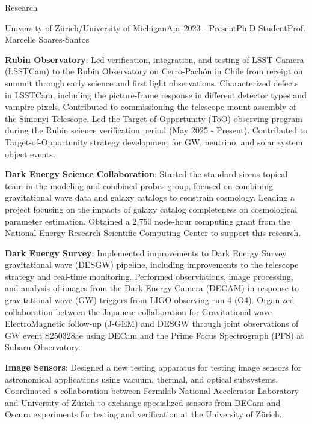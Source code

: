 \documentclass{resume} %
\begin{document}
\begin{rSection}{Research}

\begin{rSubsection}{University of Zürich/University of Michigan}{Apr 2023 - Present}{Ph.D Student}{Prof. Marcelle Soares-Santos}

    \item \textbf{Rubin Observatory}: Led verification, integration, and testing of LSST Camera (LSSTCam) to the Rubin Observatory on Cerro-Pachón in Chile from receipt on summit through early science and first light observations. Characterized defects in LSSTCam, including the picture-frame response in different detector types and vampire pixels. Contributed to commissioning the telescope mount assembly of the Simonyi Telescope. Led the Target-of-Opportunity (ToO) observing program during the Rubin science verification period (May 2025 - Present). Contributed to Target-of-Opportunity strategy development for GW, neutrino, and solar system object events. 
    \item \textbf{Dark Energy Science Collaboration}: Started the standard sirens topical team in the modeling and combined probes group, focused on combining gravitational wave data and galaxy catalogs to constrain cosmology. Leading a project focusing on the impacts of galaxy catalog completeness on cosmological parameter estimation. Obtained a 2,750 node-hour computing grant from the National Energy Research Scientific Computing Center to support this research.
     \item \textbf{Dark Energy Survey}: Implemented improvements to Dark Energy Survey gravitational wave (DESGW) pipeline, including improvements to the telescope strategy and real-time monitoring. Performed observiations, image processing, and analysis of images from the Dark Energy Camera (DECAM) in response to gravitational wave (GW) triggers from LIGO observing run 4 (O4). Organized collaboration between the  Japanese collaboration for Gravitational wave ElectroMagnetic follow-up (J-GEM) and DESGW through joint observations of GW event S250328ae using DECam and the Prime Focus Spectrograph (PFS) at Subaru Observatory. 
   \item \textbf{Image Sensors}: Designed a new testing apparatus for testing image sensors for astronomical applications using vacuum, thermal, and optical subsystems. Coordinated a collaboration between Fermilab National Accelerator Laboratory and University of Zürich to exchange specialized sensors from DECam and Oscura experiments for testing and verification at the University of Zürich. 

\end{rSubsection}
\end{rSection}
\end{document}

